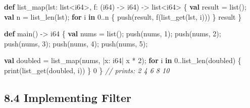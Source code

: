 \documentclass[
  english,
]{book}
\newenvironment{Shaded}{\begin{snugshade}}{\end{snugshade}}
\newcommand{\CommentTok}[1]{\textcolor[rgb]{0.42,0.60,0.33}{\textit{#1}}}
\newcommand{\ControlFlowTok}[1]{\textcolor[rgb]{0.77,0.53,0.75}{\textbf{#1}}}
\newcommand{\DataTypeTok}[1]{\textcolor[rgb]{0.31,0.79,0.69}{#1}}
\newcommand{\DecValTok}[1]{\textcolor[rgb]{0.71,0.81,0.66}{#1}}
\newcommand{\FunctionTok}[1]{\textcolor[rgb]{0.86,0.86,0.67}{#1}}
\newcommand{\KeywordTok}[1]{\textcolor[rgb]{0.34,0.61,0.84}{\textbf{#1}}}
\newcommand{\NormalTok}[1]{\textcolor[rgb]{0.83,0.83,0.83}{#1}}
\newcommand{\OperatorTok}[1]{\textcolor[rgb]{0.83,0.83,0.83}{#1}}
\begin{document}
\begin{Shaded}
\begin{Highlighting}[]
\KeywordTok{def} \FunctionTok{list\_map}\NormalTok{(lst: }\DataTypeTok{list}\OperatorTok{\textless{}}\DataTypeTok{i64}\OperatorTok{\textgreater{}}\NormalTok{, f: (}\DataTypeTok{i64}\NormalTok{) }\OperatorTok{{-}\textgreater{}} \DataTypeTok{i64}\NormalTok{) }\OperatorTok{{-}\textgreater{}} \DataTypeTok{list}\OperatorTok{\textless{}}\DataTypeTok{i64}\OperatorTok{\textgreater{}}\NormalTok{ \{}
    \KeywordTok{val} \DataTypeTok{result} \OperatorTok{=} \DataTypeTok{list}\NormalTok{();}
    \KeywordTok{val}\NormalTok{ n }\OperatorTok{=} \FunctionTok{list\_len}\NormalTok{(lst);}
    \ControlFlowTok{for}\NormalTok{ i }\ControlFlowTok{in} \DecValTok{0}\OperatorTok{..}\NormalTok{n \{}
        \FunctionTok{push}\NormalTok{(}\DataTypeTok{result}\NormalTok{, f(}\FunctionTok{list\_get}\NormalTok{(lst, i)))}
\NormalTok{    \}}
    \DataTypeTok{result}
\NormalTok{\}}

\KeywordTok{def}\NormalTok{ main() }\OperatorTok{{-}\textgreater{}} \DataTypeTok{i64}\NormalTok{ \{}
    \KeywordTok{val}\NormalTok{ nums }\OperatorTok{=} \DataTypeTok{list}\NormalTok{();}
    \FunctionTok{push}\NormalTok{(nums, }\DecValTok{1}\NormalTok{);}
    \FunctionTok{push}\NormalTok{(nums, }\DecValTok{2}\NormalTok{);}
    \FunctionTok{push}\NormalTok{(nums, }\DecValTok{3}\NormalTok{);}
    \FunctionTok{push}\NormalTok{(nums, }\DecValTok{4}\NormalTok{);}
    \FunctionTok{push}\NormalTok{(nums, }\DecValTok{5}\NormalTok{);}

    \KeywordTok{val}\NormalTok{ doubled }\OperatorTok{=} \FunctionTok{list\_map}\NormalTok{(nums, }\OperatorTok{|}\NormalTok{x: }\DataTypeTok{i64}\OperatorTok{|}\NormalTok{ x }\OperatorTok{*} \DecValTok{2}\NormalTok{);}
    \ControlFlowTok{for}\NormalTok{ i }\ControlFlowTok{in} \DecValTok{0}\OperatorTok{..}\FunctionTok{list\_len}\NormalTok{(doubled) \{}
        \FunctionTok{print}\NormalTok{(}\FunctionTok{list\_get}\NormalTok{(doubled, i))}
\NormalTok{    \}}
    \DecValTok{0}
\NormalTok{\}}
\CommentTok{// prints: 2 4 6 8 10}
\end{Highlighting}
\end{Shaded}

\subsection{8.4 Implementing Filter}\label{implementing-filter}
\end{document}
